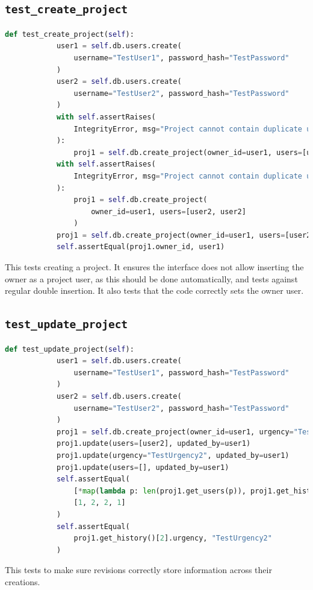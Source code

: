 \documentclass{report}
\begin{document}
	\subsection{\texttt{test\_create\_project}}
	\vspace{1em}
	\begin{lstlisting}[language=Python]
		def test_create_project(self):
			user1 = self.db.users.create(
				username="TestUser1", password_hash="TestPassword"
			)
			user2 = self.db.users.create(
				username="TestUser2", password_hash="TestPassword"
			)
			with self.assertRaises(
				IntegrityError, msg="Project cannot contain duplicate users"
			):
				proj1 = self.db.create_project(owner_id=user1, users=[user1])
			with self.assertRaises(
				IntegrityError, msg="Project cannot contain duplicate users"
			):
				proj1 = self.db.create_project(
					owner_id=user1, users=[user2, user2]
				)
			proj1 = self.db.create_project(owner_id=user1, users=[user2])
			self.assertEqual(proj1.owner_id, user1)
	\end{lstlisting}
	\vspace{1em}
	This tests creating a project. It ensures the interface does not allow inserting the owner as a
	project user, as this should be done automatically, and tests against regular double insertion.
	It also tests that the code correctly sets the owner user.
	
	\subsection{\texttt{test\_update\_project}}
	\vspace{1em}
	\begin{lstlisting}[language=Python]
		def test_update_project(self):
			user1 = self.db.users.create(
				username="TestUser1", password_hash="TestPassword"
			)
			user2 = self.db.users.create(
				username="TestUser2", password_hash="TestPassword"
			)
			proj1 = self.db.create_project(owner_id=user1, urgency="TestUrgency1")
			proj1.update(users=[user2], updated_by=user1)
			proj1.update(urgency="TestUrgency2", updated_by=user1)
			proj1.update(users=[], updated_by=user1)
			self.assertEqual(
				[*map(lambda p: len(proj1.get_users(p)), proj1.get_history())],
				[1, 2, 2, 1]
			)
			self.assertEqual(
				proj1.get_history()[2].urgency, "TestUrgency2"
			)
	\end{lstlisting}
	\vspace{1em}
	This tests to make sure revisions correctly store information across their creations.
	
\end{document}

